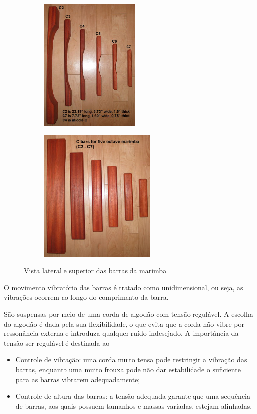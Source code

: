 \documentclass{article}
\begin{document}
\begin{figure}[h!]
	\centering
	\begin{subfigure}{0.45\textwidth}
		\centering
		\includegraphics[height=245px]{marimba_bars.jpg}
	\end{subfigure}
	\hfill
	\begin{subfigure}{0.45\textwidth}
		\centering
		\includegraphics[height=245px]{marimba_bars-top.jpg}
	\end{subfigure}
	\caption{Vista lateral e superior das barras da marimba~\cite{lafavre_tuning_marimba}}
\end{figure}

O movimento vibratório das barras é tratado como unidimensional, ou seja, as vibrações ocorrem ao longo do comprimento da barra.

São suspensas por meio de uma corda de algodão com tensão regulável. A escolha do algodão é dada pela sua flexibilidade, o que evita que a corda não vibre por ressonância externa e introduza qualquer ruído indesejado. A importância da tensão ser regulável é destinada ao

\begin{itemize}
  \item Controle de vibração: uma corda muito tensa pode restringir a vibração das barras, enquanto uma muito frouxa pode não dar estabilidade o suficiente para as barras vibrarem adequadamente;
  \item Controle de altura das barras: a tensão adequada garante que uma sequência de barras, aos quais possuem tamanhos e massas variadas, estejam alinhadas.
\end{itemize}
\end{document}
